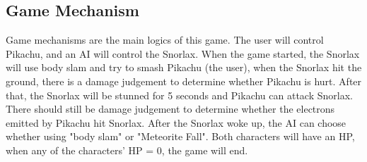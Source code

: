 \documentclass {article}
\begin{document}
    \subsection{Game Mechanism}
    Game mechanisms are the main logics of this game. The user will control Pikachu, and an AI will control the Snorlax. When the game started, the Snorlax will use body slam and try to 
    smash Pikachu (the user), when the Snorlax hit the ground, there is a damage judgement to determine whether Pikachu is hurt.
    After that, the Snorlax will be stunned for 5 seconds and Pikachu can attack Snorlax. There should still be damage judgement
    to determine whether the electrons emitted by Pikachu hit Snorlax. After the Snorlax woke up, the AI can choose whether using "body slam" or 
    "Meteorite Fall". Both characters will have an HP, when any of the characters' HP = 0, the game will end.
\end{document}
